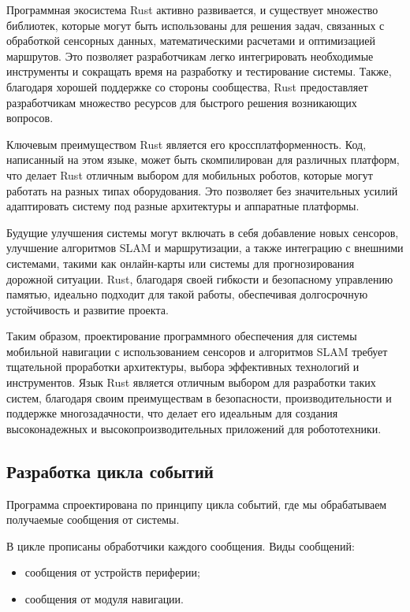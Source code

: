Программная экосистема Rust активно развивается, и существует множество
библиотек, которые могут быть использованы для решения задач, связанных с
обработкой сенсорных данных, математическими расчетами и оптимизацией маршрутов.
Это позволяет разработчикам легко интегрировать необходимые инструменты и
сокращать время на разработку и тестирование системы. Также, благодаря хорошей
поддержке со стороны сообщества, Rust предоставляет разработчикам множество
ресурсов для быстрого решения возникающих вопросов.

Ключевым преимуществом Rust является его кроссплатформенность. Код, написанный
на этом языке, может быть скомпилирован для различных платформ, что делает Rust
отличным выбором для мобильных роботов, которые могут работать на разных типах
оборудования. Это позволяет без значительных усилий адаптировать систему под
разные архитектуры и аппаратные платформы.

Будущие улучшения системы могут включать в себя добавление новых сенсоров,
улучшение алгоритмов SLAM и маршрутизации, а также интеграцию с внешними
системами, такими как онлайн-карты или системы для прогнозирования дорожной
ситуации. Rust, благодаря своей гибкости и безопасному управлению памятью,
идеально подходит для такой работы, обеспечивая долгосрочную устойчивость и
развитие проекта.

Таким образом, проектирование программного обеспечения для системы мобильной
навигации с использованием сенсоров и алгоритмов SLAM требует тщательной
проработки архитектуры, выбора эффективных технологий и инструментов. Язык Rust
является отличным выбором для разработки таких систем, благодаря своим
преимуществам в безопасности, производительности и поддержке многозадачности,
что делает его идеальным для создания высоконадежных и высокопроизводительных
приложений для робототехники.

\subsection{Разработка цикла событий}

Программа спроектирована по принципу цикла событий, где мы обрабатываем
получаемые сообщения от системы.

В цикле прописаны обработчики каждого сообщения.
Виды сообщений:
\begin{itemize}
	\item сообщения от устройств периферии;
	\item сообщения от модуля навигации.
\end{itemize}

